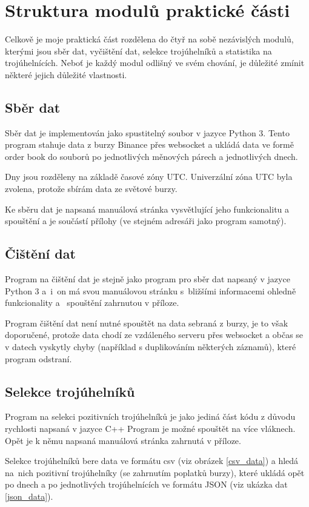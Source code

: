 \documentclass[thesis=B,czech]{FITthesis}[2019/03/21]
\begin{document}
\section{Struktura modulů praktické části}
Celkově je moje praktická část rozdělena do čtyř na sobě nezávislých modulů, kterými jsou sběr dat, vyčištění dat, selekce trojúhelníků a statistika na trojúhelnících. Neboť je každý modul odlišný ve svém chování, je důležité zmínit některé jejich důležité vlastnosti.

\subsection{Sběr dat}
Sběr dat je implementován jako spustitelný soubor v jazyce Python 3. Tento program stahuje data z burzy Binance přes websocket a ukládá data ve formě order book do souborů po jednotlivých měnových párech a jednotlivých dnech.

Dny jsou rozděleny na základě časové zóny UTC. Univerzální zóna UTC byla zvolena, protože sbírám data ze světové burzy. 

Ke sběru dat je napsaná manuálová stránka vysvětlující jeho funkcionalitu a spouštění a je součástí přílohy (ve stejném adresáři jako program samotný).

\subsection{Čištění dat}
\label{subsection:cleanup}
Program na čištění dat je stejně jako program pro sběr dat napsaný v jazyce Python 3 a~i~on má svou manuálovou stránku s~bližšími informacemi ohledně funkcionality a~ spouštění zahrnutou v příloze. 

Program čištění dat není nutné spouštět na data sebraná z burzy, je to však doporučené, protože data chodí ze vzdáleného serveru přes websocket a občas se v datech vyskytly chyby (například s duplikováním některých záznamů), které program odstraní.

\subsection{Selekce trojúhelníků}
Program na selekci pozitivních trojúhelníků je jako jediná část kódu z důvodu rychlosti napsaná v jazyce C++ Program je možné spouštět na více vláknech. Opět je k němu napsaná manuálová stránka zahrnutá v příloze. 

Selekce trojúhelníků bere data ve formátu csv (viz obrázek \ref{csv_data}) a hledá na~nich pozitivní trojúhelníky (se zahrnutím poplatků burzy), které ukládá opět po dnech a po jednotlivých trojúhelnících ve formátu JSON (viz ukázka dat \ref{json_data}).
\end{document}
